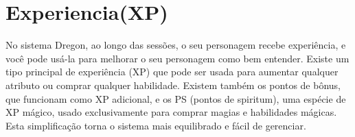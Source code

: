 





\section{Experiencia(XP)}

No sistema Dregon, ao longo das sessões, o seu personagem recebe experiência, e você pode usá-la para melhorar o seu personagem como bem entender. Existe um tipo principal de experiência (XP) que pode ser usada para aumentar qualquer atributo ou comprar qualquer habilidade. Existem também os pontos de bônus, que funcionam como XP adicional, e os PS (pontos de spiritum), uma espécie de XP mágico, usado exclusivamente para comprar magias e habilidades mágicas. Esta simplificação torna o sistema mais equilibrado e fácil de gerenciar.


